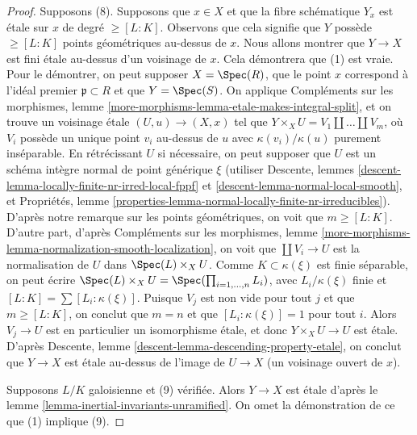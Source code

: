 \begin{proof}
\medskip\noindent
Supposons (8). Supposons que $x \in X$ et que la fibre schématique $Y_x$
est étale sur $x$ de degré $\geq [L : K]$. Observons que cela signifie
que $Y$ possède $\geq [L : K]$ points géométriques au-dessus de $x$.
Nous allons montrer que $Y \to X$ est fini étale au-dessus d'un voisinage de $x$.
Cela démontrera que (1) est vraie.
Pour le démontrer, on peut supposer $X = \Spec(R)$, que le point $x$ correspond à
l'idéal premier $\mathfrak p \subset R$ et que $Y = \Spec(S)$. On applique
Compléments sur les morphismes,
lemme \ref{more-morphisms-lemma-etale-makes-integral-split}, et on trouve un
voisinage étale $(U, u) \to (X, x)$ tel que
$Y \times_X U = V_1 \amalg \ldots \amalg V_m$, où $V_i$
possède un unique point $v_i$ au-dessus de $u$ avec $\kappa(v_i)/\kappa(u)$
purement inséparable. En rétrécissant $U$ si nécessaire, on peut supposer que $U$ est
un schéma intègre normal de point générique $\xi$ (utiliser
Descente, lemmes \ref{descent-lemma-locally-finite-nr-irred-local-fppf} et
\ref{descent-lemma-normal-local-smooth}, et
Propriétés, lemme \ref{properties-lemma-normal-locally-finite-nr-irreducibles}).
D'après notre remarque sur les points géométriques, on voit que $m \geq [L : K]$.
D'autre part, d'après Compléments sur les morphismes, lemme
\ref{more-morphisms-lemma-normalization-smooth-localization},
on voit que $\coprod V_i \to U$ est la normalisation de $U$ dans
$\Spec(L) \times_X U$. Comme $K \subset \kappa(\xi)$ est finie séparable,
on peut écrire $\Spec(L) \times_X U = \Spec(\prod_{i = 1, \ldots, n} L_i)$,
avec $L_i/\kappa(\xi)$ finie et $[L : K] = \sum [L_i : \kappa(\xi)]$.
Puisque $V_j$ est non vide pour tout $j$ et que $m \geq [L : K]$,
on conclut que $m = n$ et que $[L_i : \kappa(\xi)] = 1$
pour tout $i$. Alors $V_j \to U$ est en particulier un isomorphisme
étale, et donc $Y \times_X U \to U$ est étale. D'après
Descente, lemme \ref{descent-lemma-descending-property-etale},
on conclut que $Y \to X$ est étale au-dessus de
l'image de $U \to X$ (un voisinage ouvert de $x$).

\medskip\noindent
Supposons $L/K$ galoisienne et (9) vérifiée. Alors $Y \to X$ est étale
d'après le lemme \ref{lemma-inertial-invariants-unramified}.
On omet la démonstration de ce que (1) implique (9).
\end{proof}

